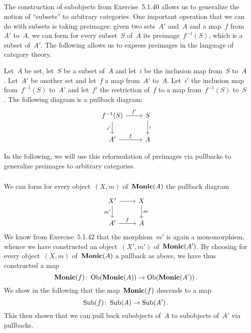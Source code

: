 \subsection{}

The construction of subobjects from Exercise~5.1.40 allows us to generalize the notion of \enquote{subsets} to arbitrary categories.
One important operation that we can do with subsets is taking preimages:
given two sets~$A'$ and~$A$ and a map~$f$ from~$A'$ to~$A$, we can form for every subset~$S$ of~$A$ its preimage~$f^{-1}(S)$, which is a subset of~$A'$.
The following  allows us to express preimages in the language of category theory.

\begin{proposition}
	\label{preimages as pullbacks}
	Let~$A$ be set, let~$S$ be a subset of~$A$ and let~$i$ be the inclusion map from~$S$ to~$A$.
	Let~$A'$ be another set and let~$f$ a map from~$A'$ to~$A$.
	Let~$i'$ the inclusion map from~$f^{-1}(S)$ to~$A'$ and let~$f'$ the restriction of~$f$ to a map from~$f^{-1}(S)$ to~$S$.
	The following diagram is a pullback diagram:
	\[
		\begin{tikzcd}
			f^{-1}(S)
			\arrow{r}[above]{f'}
			\arrow{d}[left]{i'}
			&
			S
			\arrow{d}[right]{i}
			\\
			A'
			\arrow{r}[above]{f}
			&
			A
		\end{tikzcd}
	\]
\end{proposition}

In the following, we will use this reformulation of preimages via pullbacks to generalize preimages to arbitrary categories.



\subsubsection{}

We can form for every object~$(X, m)$ of~$\mathbf{Monic}(A)$ the pullback diagram
\begin{equation}
	\label{preimages via pullback diagrams}
	\begin{tikzcd}
		X'
		\arrow{r}
		\arrow{d}[left]{m'}
		&
		X
		\arrow{d}[right]{m}
		\\
		A'
		\arrow{r}[above]{f}
		&
		A
	\end{tikzcd}
\end{equation}
We know from Exercise~5.1.42 that the morphism~$m'$ is again a monomorphism, whence we have constructed an object~$(X', m')$ of~$\mathbf{Monic}(A')$.
By choosing for every object~$(X, m)$ of~$\mathbf{Monic}(A)$ a pullback as above, we have thus constructed a map
\[
	\mathbf{Monic}(f)
	\colon
	\operatorname{Ob}(\mathbf{Monic}(A))
	\to
	\operatorname{Ob}(\mathbf{Monic}(A')) \,.
\]
We show in the following that the map~$\mathbf{Monic}(f)$ descends to a map
\[
	\operatorname{Sub}(f)
	\colon
	\operatorname{Sub}(A) \to \operatorname{Sub}(A') \,.
\]
This then shown that we can pull back subobjects of~$A$ to subobjects of~$A'$ via pullbacks.

